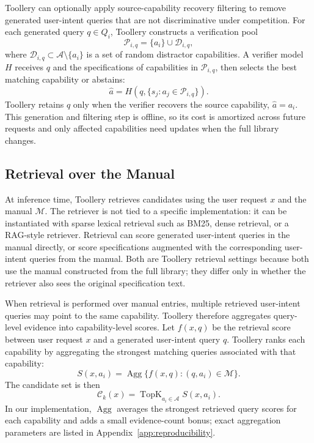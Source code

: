 \documentclass[11pt]{article}
\begin{document}
Toollery can optionally apply source-capability recovery filtering to remove generated user-intent queries that are not discriminative under competition. For each generated query $q\in Q_i$, Toollery constructs a verification pool
\begin{equation}
    \mathcal{P}_{i,q}=\{a_i\}\cup\mathcal{D}_{i,q},
\end{equation}
where $\mathcal{D}_{i,q}\subset\mathcal{A}\setminus\{a_i\}$ is a set of random distractor capabilities. A verifier model $H$ receives $q$ and the specifications of capabilities in $\mathcal{P}_{i,q}$, then selects the best matching capability or abstains:
\begin{equation}
    \hat{a}=H(q,\{s_j:a_j\in\mathcal{P}_{i,q}\}).
\end{equation}
Toollery retains $q$ only when the verifier recovers the source capability, $\hat{a}=a_i$. This generation and filtering step is offline, so its cost is amortized across future requests and only affected capabilities need updates when the full library changes.

\subsection{Retrieval over the Manual}
\label{subsec:retrieval-aggregation}

At inference time, Toollery retrieves candidates using the user request $x$ and the manual $\mathcal{M}$. The retriever is not tied to a specific implementation: it can be instantiated with sparse lexical retrieval such as BM25, dense retrieval, or a RAG-style retriever. Retrieval can score generated user-intent queries in the manual directly, or score specifications augmented with the corresponding user-intent queries from the manual. Both are Toollery retrieval settings because both use the manual constructed from the full library; they differ only in whether the retriever also sees the original specification text.

When retrieval is performed over manual entries, multiple retrieved user-intent queries may point to the same capability. Toollery therefore aggregates query-level evidence into capability-level scores. Let $f(x,q)$ be the retrieval score between user request $x$ and a generated user-intent query $q$. Toollery ranks each capability by aggregating the strongest matching queries associated with that capability:
\begin{equation}
    S(x,a_i)=\operatorname{Agg}\{f(x,q): (q,a_i)\in\mathcal{M}\}.
\end{equation}
The candidate set is then
\begin{equation}
    \mathcal{C}_k(x)=\operatorname{TopK}_{a_i\in\mathcal{A}} S(x,a_i).
\end{equation}
In our implementation, $\operatorname{Agg}$ averages the strongest retrieved query scores for each capability and adds a small evidence-count bonus; exact aggregation parameters are listed in Appendix~\ref{app:reproducibility}.
\end{document}
